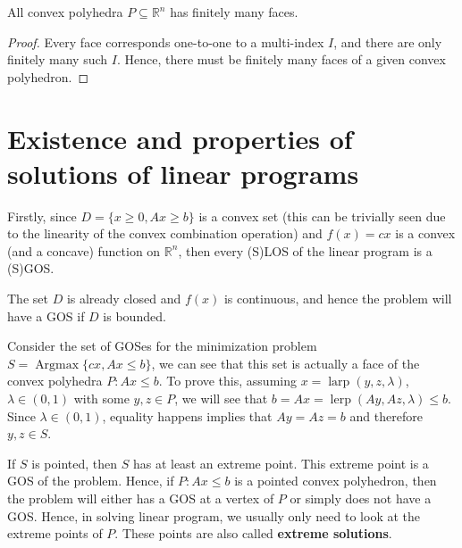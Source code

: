 \begin{corollary}
\label{cor:Finiteness of faces in convex polyhedra}
  All convex polyhedra \( P \subseteq \mathbb{R}^{n} \) has finitely many faces.
\end{corollary}

\begin{proof}
  Every face corresponds one-to-one to a multi-index \( I \), and there are only
  finitely many such \( I \). Hence, there must be finitely many faces of a
  given convex polyhedron. 
\end{proof}




\section{Existence and properties of solutions of linear programs} %
\label{sec:Existence and properties of solutions of linear programs}

Firstly, since \( D = \{x\ge 0, Ax \ge  b\}   \) is a convex set (this can be
trivially seen due to the linearity of the convex combination operation) and \(
f(x)=cx\) is a convex (and a concave) function on \( \mathbb{R}^{n} \), then
every (S)LOS of the linear program is a (S)GOS.

The set \( D \) is already closed and \( f(x) \) is continuous, and hence
the problem will have a GOS if \( D \) is bounded.

Consider the set of GOSes for the minimization problem \( S =
\operatorname{Argmax} \{cx, Ax \le  b\}   \), we can see that this set is
actually a face of the convex polyhedra \( P: Ax \le b \). To prove this,
assuming \( x = \operatorname{larp}(y, z, \lambda) \), \( \lambda \in (0, 1) \)
with some \( y, z \in P \), we will see that \( b = Ax = \operatorname{lerp}(Ay, Az,
\lambda) \le  b \). Since \( \lambda \in (0,1) \), equality happens implies that
\( Ay = Az = b \) and therefore \( y, z \in S \).

If \( S \) is pointed, then \( S \) has at least an extreme point. This extreme
point is a GOS of the problem. Hence, if \( P: Ax \le  b \) is a pointed convex
polyhedron, then the problem will either has a GOS at a vertex of \( P \) or
simply does not have a GOS. Hence, in solving linear program, we usually only
need to look at the extreme points of \( P \). These points are also called
\textbf{extreme solutions}.

